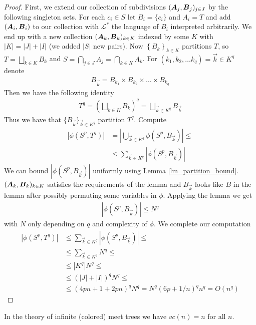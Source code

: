 \documentclass{amsart}
\DeclareMathOperator{\AT}{\boldface A}
\DeclareMathOperator{\BT}{\boldface B}
\renewcommand{\LL}{\mathcal L}
\newcommand{\LLU}{\LL^*}
\newcommand{\curly}[1]{\left\{#1\right\}}
\begin{document}
\begin{proof}
  First, we extend our collection of subdivisions $(\AT_j, \BT_j)_{j \in J}$ by the following singleton sets. For each $c_i \in S$ let $B_i = \{c_i\}$ and $A_i = T$ and add $(\AT_i, \BT_i)$ to our collection with $\LLU$ the language of $B_i$ interpreted arbitrarily. We end up with a new collection $(\AT_k, \BT_k)_{k \in K}$ indexed by some $K$ with $|K| = |J| + |I|$ (we added $|S|$ new pairs). Now $\curly{B_k}_{k \in K}$ partitions $T$, so $T = \bigsqcup_{k \in K} B_k$ and $S = \bigcap_{j \in J} A_j = \bigcap_{k \in K} A_k$. For $(k_1, k_2, \ldots k_q) = \vec k \in K^q$ denote 
  \begin{align*}
    B_{\vec k} = B_{k_1} \times B_{k_2} \times \ldots \times B_{k_q}
  \end{align*}
  Then we have the following identity
  \begin{align*}
    T^q = (\bigsqcup_{k \in K} B_k)^q = \bigsqcup_{\vec k \in K^q} B_{\vec k}
  \end{align*}
  Thus we have that $\{B_{\vec k}\}_{\vec k \in K^q}$ partition $T^q$. Compute
  \begin{align*}
    |\phi(S^p, T^q)|
    &= \left|\bigcup_{\vec k \in K^q} \phi(S^p, B_{\vec k}) \right| \leq \\
    &\leq \sum_{\vec k \in K^q} |\phi(S^p, B_{\vec k})|
  \end{align*}
  We can bound $|\phi(S^p, B_{\vec k})|$ uniformly using Lemma \ref{lm_partition_bound}. $(\AT_k, \BT_k)_{k \in K}$ satisfies the requirements of the lemma and $B_{\vec k}$ looks like $B$ in the lemma after possibly permuting some variables in $\phi$. Applying the lemma we get
  \begin{align*}
    |\phi(S^p, B_{\vec k})| \leq N^q
  \end{align*}
  with $N$ only depending on $q$ and complexity of $\phi$. We complete our computation
  \begin{align*}
    |\phi(S^p, T^q)|
    &\leq \sum_{\vec k \in K^q} |\phi(S^p, B_{\vec k})| \leq \\
    &\leq \sum_{\vec k \in K^q} N^q \leq \\
    &\leq |K^q| N^q \leq \\
    &\leq (|J| + |I|)^q N^q \leq \\
    &\leq (4pn + 1 + 2pn)^q N^q = N^q (6p + 1/n)^q n^q = O(n^q)
  \end{align*}
\end{proof}
\begin{Corollary}
  In the theory of infinite (colored) meet trees we have $vc(n) = n$ for all $n$.
\end{Corollary}
\end{document}
